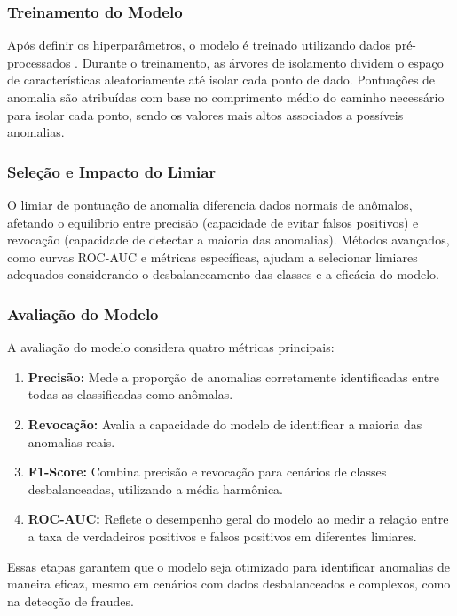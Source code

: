 \documentclass[12pt,a4paper]{article}
\begin{document}
\subsubsection{Treinamento do Modelo}
Após definir os hiperparâmetros, o modelo é treinado utilizando dados pré-processados \cite{meduri2024}. Durante o treinamento, as árvores de isolamento dividem o espaço de características aleatoriamente até isolar cada ponto de dado. Pontuações de anomalia são atribuídas com base no comprimento médio do caminho necessário para isolar cada ponto, sendo os valores mais altos associados a possíveis anomalias.

\subsubsection{Seleção e Impacto do Limiar}
O limiar de pontuação de anomalia diferencia dados normais de anômalos, afetando o equilíbrio entre precisão (capacidade de evitar falsos positivos) e revocação (capacidade de detectar a maioria das anomalias). Métodos avançados, como curvas ROC-AUC e métricas específicas, ajudam a selecionar limiares adequados considerando o desbalanceamento das classes e a eficácia do modelo.

\subsubsection{Avaliação do Modelo}
A avaliação do modelo considera quatro métricas principais:
\begin{enumerate}
    \item \textbf{Precisão:} Mede a proporção de anomalias corretamente identificadas entre todas as classificadas como anômalas.
    \item \textbf{Revocação:} Avalia a capacidade do modelo de identificar a maioria das anomalias reais.
    \item \textbf{F1-Score:} Combina precisão e revocação para cenários de classes desbalanceadas, utilizando a média harmônica.
    \item \textbf{ROC-AUC:} Reflete o desempenho geral do modelo ao medir a relação entre a taxa de verdadeiros positivos e falsos positivos em diferentes limiares.
\end{enumerate}

Essas etapas garantem que o modelo seja otimizado para identificar anomalias de maneira eficaz, mesmo em cenários com dados desbalanceados e complexos, como na detecção de fraudes.



\newpage

\end{document}

